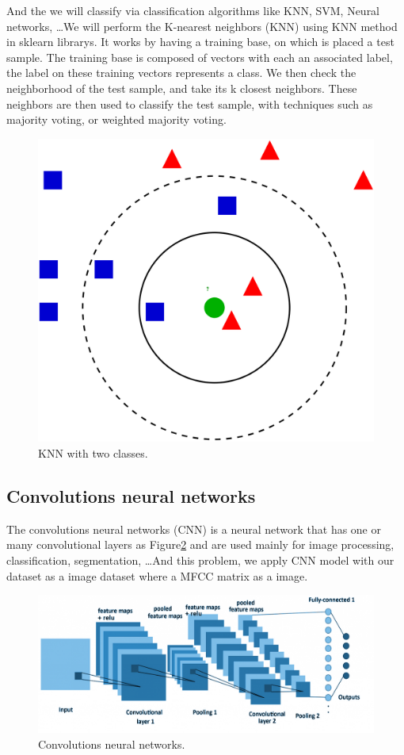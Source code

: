 \documentclass[%
  article,%
  10pt,%
  a4paper,%
  fleqn,%
  oneside,%
  sumario = tradicional,%
  chapter = TITLE,%
  section = TITLE,%
]{abntex2}
\begin{document}
And the we will classify via classification algorithms like KNN, SVM, Neural networks, \dots  We will perform the K-nearest neighbors (KNN) using KNN method in sklearn librarys. It works by having a training base, on which is placed a test sample. The training base is composed of vectors with each an associated label, the label on these training vectors represents a class. We then check the neighborhood of the test sample, and take its k closest neighbors. These neighbors are then used to classify the test sample, with techniques such as majority voting, or weighted majority voting.

\begin{figure}[H]
  \centering
  \caption{KNN with two classes.}
  \label{fig:knn}
  \includegraphics[width = 0.5\columnwidth]{./Figuras/knn}
\end{figure}

\subsection{Convolutions neural networks}
The convolutions neural networks (CNN) is a neural network that has one or many convolutional layers as Figure\ref{fig:cnn} and are used mainly for image processing, classification, segmentation, \dots And this problem, we apply CNN model with our dataset as a image dataset where a MFCC matrix as a image.

\begin{figure}[H]
  \centering
  \includegraphics[width = 0.8\columnwidth]{./Figuras/cnn-1-1024x420}
  \caption{Convolutions neural networks.}
  \label{fig:cnn}
\end{figure}
\end{document}
